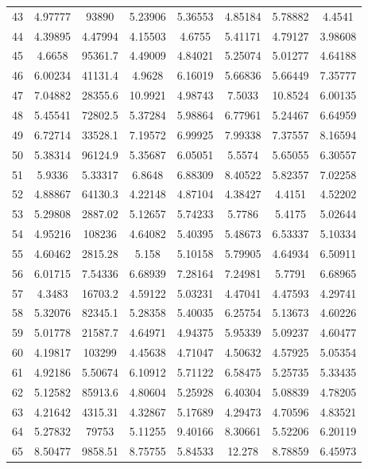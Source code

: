 \begin{center}
\begin{longtable}{cccccccc}
43 & 4.97777 & 93890 & 5.23906 & 5.36553 & 4.85184 & 5.78882 & 4.4541\\
44 & 4.39895 & 4.47994 & 4.15503 & 4.6755 & 5.41171 & 4.79127 & 3.98608\\
45 & 4.6658 & 95361.7 & 4.49009 & 4.84021 & 5.25074 & 5.01277 & 4.64188\\
46 & 6.00234 & 41131.4 & 4.9628 & 6.16019 & 5.66836 & 5.66449 & 7.35777\\
47 & 7.04882 & 28355.6 & 10.9921 & 4.98743 & 7.5033 & 10.8524 & 6.00135\\
48 & 5.45541 & 72802.5 & 5.37284 & 5.98864 & 6.77961 & 5.24467 & 6.64959\\
49 & 6.72714 & 33528.1 & 7.19572 & 6.99925 & 7.99338 & 7.37557 & 8.16594\\
50 & 5.38314 & 96124.9 & 5.35687 & 6.05051 & 5.5574 & 5.65055 & 6.30557\\
51 & 5.9336 & 5.33317 & 6.8648 & 6.88309 & 8.40522 & 5.82357 & 7.02258\\
52 & 4.88867 & 64130.3 & 4.22148 & 4.87104 & 4.38427 & 4.4151 & 4.52202\\
53 & 5.29808 & 2887.02 & 5.12657 & 5.74233 & 5.7786 & 5.4175 & 5.02644\\
54 & 4.95216 & 108236 & 4.64082 & 5.40395 & 5.48673 & 6.53337 & 5.10334\\
55 & 4.60462 & 2815.28 & 5.158 & 5.10158 & 5.79905 & 4.64934 & 6.50911\\
56 & 6.01715 & 7.54336 & 6.68939 & 7.28164 & 7.24981 & 5.7791 & 6.68965\\
57 & 4.3483 & 16703.2 & 4.59122 & 5.03231 & 4.47041 & 4.47593 & 4.29741\\
58 & 5.32076 & 82345.1 & 5.28358 & 5.40035 & 6.25754 & 5.13673 & 4.60226\\
59 & 5.01778 & 21587.7 & 4.64971 & 4.94375 & 5.95339 & 5.09237 & 4.60477\\
60 & 4.19817 & 103299 & 4.45638 & 4.71047 & 4.50632 & 4.57925 & 5.05354\\
61 & 4.92186 & 5.50674 & 6.10912 & 5.71122 & 6.58475 & 5.25735 & 5.33435\\
62 & 5.12582 & 85913.6 & 4.80604 & 5.25928 & 6.40304 & 5.08839 & 4.78205\\
63 & 4.21642 & 4315.31 & 4.32867 & 5.17689 & 4.29473 & 4.70596 & 4.83521\\
64 & 5.27832 & 79753 & 5.11255 & 9.40166 & 8.30661 & 5.52206 & 6.20119\\
65 & 8.50477 & 9858.51 & 8.75755 & 5.84533 & 12.278 & 8.78859 & 6.45973\\

\end{longtable}
\end{center}
